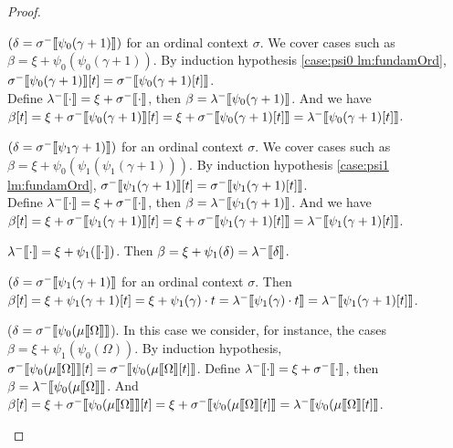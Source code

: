\documentclass{amsart}
\theoremstyle{plain}
\theoremstyle{plain}
\def\scbrl{[\hspace{-.14em}[}
\def\scbrr{]\hspace{-.14em}]}
\def\scbr#1{\scbrl#1\scbrr}
\newcommand{\Om}{{\Omega}}
\newcommand{\be}{{\beta}}
\newcommand{\ga}{\gamma}
\newcommand{\de}{\delta}
\newcommand{\la}{\lambda}
\def\scbrl{[\hspace{-.14em}[}
\def\scbrr{]\hspace{-.14em}]}
\def\scbr#1{\scbrl#1\scbrr}
\begin{document}
\begin{proof}
\begin{Cases}
\begin{Cases}
\item $(\de = \sigma^-\scbr{\psi_0(\ga+1)})$  for an ordinal context $\sigma$.
We cover cases such as $\be = \xi+ \psi_0(\psi_0(\ga+1))$.
By induction hypothesis \ref{case:psi0 lm:fundamOrd}, 
$\sigma^-\scbr{\psi_0(\ga+1)}[t] = \sigma^-\scbr{\psi_0(\ga+1)[t]}$.
\\
Define $\la^-\scbr{\cdot} = \xi +\sigma^-\scbr{\cdot}$, then $\be=\la^-\scbr{\psi_0(\ga+1)}$.
And we have $\be[t] = \xi +\sigma^-\scbr{\psi_0(\ga+1)}[t] = \xi + \sigma^-\scbr{\psi_0(\ga+1)[t]} = \la^-\scbr{\psi_0(\ga+1)[t]}$.\medskip


\item $(\de = \sigma^-\scbr{\psi_1\ga+1)})$  for an ordinal context $\sigma$.
We cover cases such as $\be = \xi+ \psi_0(\psi_1(\psi_1(\ga+1)))$.
By induction hypothesis \ref{case:psi1 lm:fundamOrd},
$\sigma^-\scbr{\psi_1(\ga+1)}[t] = \sigma^-\scbr{\psi_1(\ga+1)[t]}$.\\
Define $\la^-\scbr{\cdot} = \xi +\sigma^-\scbr{\cdot}$, then $\be=\la^-\scbr{\psi_1(\ga+1)}$.
And we have $\be[t] = \xi +\sigma^-\scbr{\psi_1(\ga+1)}[t] = \xi + \sigma^-\scbr{\psi_1(\ga+1)[t]} = \la^-\scbr{\psi_1(\ga+1)[t]}$.\medskip

\end{Cases}

\item $\la^-\scbr{\cdot} =\xi + \psi_1(\scbr{\cdot})$. Then $\be=\xi+\psi_1(\de) = \la^-\scbr{\de}$.
\begin{Cases}  
\item $(\de= \sigma^-\scbr{\psi_1(\ga+1)}$ for an ordinal context $\sigma$. 
Then $\be[t] = \xi + \psi_1(\ga+1)[t] = \xi+ \psi_1(\ga)\cdot t = \la^-\scbr{\psi_1(\ga)\cdot t} = \la^-\scbr{\psi_1(\ga+1)[t]}$.\medskip

\item ($\de =\sigma^-\scbr{\psi_0(\mu\scbr{\Om}}$).
In this case we consider, for instance, the cases $\be = \xi + \psi_1(\psi_0(\Om))$.
By induction hypothesis, $\sigma^-\scbr{\psi_0(\mu\scbr{\Om}}[t] = \sigma^-\scbr{\psi_0(\mu\scbr{\Om}[t]}$. 
Define $\la^-\scbr{\cdot} = \xi + \sigma^-\scbr{\cdot}$, then $\be = \la^-\scbr{\psi_0(\mu\scbr{\Om}}$.
And $\be[t] = \xi + \sigma^-\scbr{\psi_0(\mu\scbr{\Om}}[t] = \xi + \sigma^-\scbr{\psi_0(\mu\scbr{\Om}[t]} = \la^-\scbr{\psi_0(\mu\scbr{\Om}[t]}$.\medskip
\end{Cases}

\end{Cases}
\end{proof}
\end{document}
